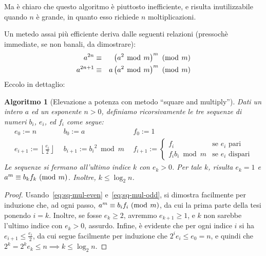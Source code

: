 \documentclass[pdflatex,11pt,a4paper,oneside]{article}
\newcommand{\p}[1]{\left({#1}\right)}
\newcommand{\floor}[1]{\left\lfloor{#1}\right\rfloor}
\newcommand{\congruent}[0]{\equiv}
\newcommand{\mmodop}[0]{\ensuremath{\operatorname{mod}}}
\newcommand{\mmod}[1]{\ensuremath{\allowbreak\ (\mmodop\:{#1})}}
\newcommand{\rem}[2]{\ensuremath{{#1}\:\mmodop\:{#2}}}
\newtheorem{algorithm}[TheoremLike]{Algoritmo}
\begin{document}
Ma \`e chiaro che questo algoritmo \`e piuttosto inefficiente, e risulta
inutilizzabile quando $n$ \`e grande, in quanto esso richiede $n$
moltiplicazioni.

Un metedo assai pi\`u efficiente deriva dalle seguenti relazioni
(pressoch\`e immediate, se non banali, da dimostrare):
\begin{eqnarray}
  a^{2n}   & \congruent & \p{\rem{a^2}{m}}^m \mmod m
    \label{eq:sq-mul-even}
  \\
  a^{2n+1} & \congruent & a \p{\rem{a^2}{m}}^m \mmod m
    \label{eq:sq-mul-odd}
\end{eqnarray}
%
Eccolo in dettaglio:
\begin{algorithm}[Elevazione a potenza con metodo ``square and multiply'']
\label{alg:square-and-multiply}
Dati un intero $a$ ed un esponente $n > 0$, definiamo ricorsivamente le
tre sequenze di numeri $b_i$, $e_i$, ed $f_i$ come segue:
\begin{displaymath}
  \begin{array}{lll}
    e_0 := n &
    b_0 := a &
    f_0 := 1
  \\
    e_{i+1} := \floor{\frac{e_i}{2}} ~~ &
    b_{i+1} := \rem{{b_i}^2}{m} ~~ &
    f_{i+1} := \begin{cases}
             f_i & \text{se $e_i$ pari} \\
             \rem{f_i b_i}{m} & \text{se $e_i$ dispari}
           \end{cases}
  \end{array}
\end{displaymath}
Le sequenze si fermano all'ultimo indice $k$ con $e_k > 0$.  Per tale
$k$, risulta $e_k = 1$ e $a^m \congruent b_k f_k \mmod m$.  Inoltre,
$k \leq \log_2 n$.
\end{algorithm}

\begin{proof}
Usando~\eqref{eq:sq-mul-even} e~\eqref{eq:sq-mul-odd}, si dimostra
facilmente per induzione che, ad ogni passo, $a^m \congruent b_i f_i
\mmod m$, da cui la prima parte della tesi ponendo $i = k$.  Inoltre,
se fosse $e_k \geq 2$, avremmo $e_{k+1} \geq 1$, e $k$ non sarebbe
l'ultimo indice con $e_k > 0$, assurdo.  Infine, \`e evidente che
per ogni indice $i$ si ha $e_{i+1} \leq \frac{e_i}{2}$, da cui segue
facilmente per induzione che $2^i e_i \leq e_0 = n$, e quindi che
$2^k = 2^k e_k \leq n \implies k \leq \log_2 n$.
\end{proof}

\end{document}
